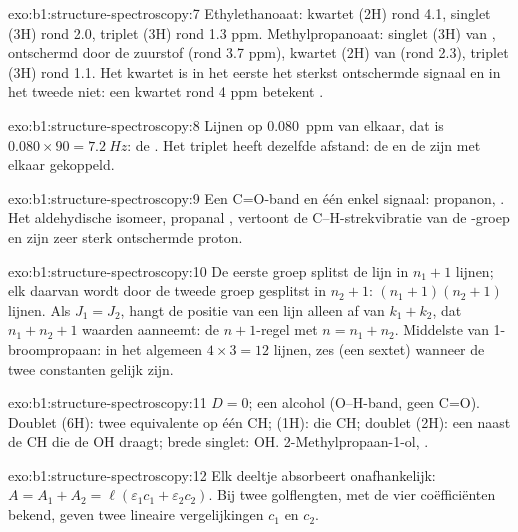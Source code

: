 \begin{solution}{exo:b1:structure-spectroscopy:7}
Ethylethanoaat: kwartet (2H) rond 4.1, singlet (3H) rond 2.0, triplet
(3H) rond 1.3 ppm. Methylpropanoaat: singlet (3H) van ,
ontschermd door de zuurstof (rond 3.7 ppm), kwartet (2H) van
 (rond 2.3), triplet (3H) rond 1.1. Het kwartet is in het
eerste het sterkst ontschermde signaal en in het tweede niet: een kwartet
rond 4 ppm betekent .
\end{solution}

\begin{solution}{exo:b1:structure-spectroscopy:8}
Lijnen op \qty{0.080}{ppm} van elkaar, dat is $0.080 \times 90 = \qty{7.2}{Hz}$:
de . Het triplet heeft dezelfde afstand: de 
en de  zijn met elkaar gekoppeld.
\end{solution}

\begin{solution}{exo:b1:structure-spectroscopy:9}
Een C=O-band en één enkel signaal: propanon, . Het
aldehydische isomeer, propanal , vertoont de
C--H-strekvibratie van de -groep en zijn zeer sterk ontschermde
proton.
\end{solution}

\begin{solution}{exo:b1:structure-spectroscopy:10}
De eerste groep splitst de lijn in $n_1 + 1$ lijnen; elk daarvan wordt
door de tweede groep gesplitst in $n_2 + 1$: $(n_1 + 1)(n_2 + 1)$ lijnen.
Als $J_1 =
J_2$, hangt de positie van een lijn alleen af van $k_1 + k_2$, dat
$n_1 + n_2 +
1$ waarden aanneemt: de $n + 1$-regel met $n = n_1 + n_2$. Middelste
 van 1-broompropaan: in het algemeen $4 \times 3 = 12$ lijnen,
zes (een sextet) wanneer de twee constanten gelijk zijn.
\end{solution}

\begin{solution}{exo:b1:structure-spectroscopy:11}
$D = 0$; een alcohol (O--H-band, geen C=O). Doublet (6H): twee
equivalente  op één CH;  (1H): die CH; doublet (2H): een
 naast de CH die de OH draagt; brede singlet: OH.
2-Methylpropaan-1-ol, .
\end{solution}

\begin{solution}{exo:b1:structure-spectroscopy:12}
Elk deeltje absorbeert onafhankelijk: $A = A_1 + A_2 = \ell(\varepsilon_1c_1
+ \varepsilon_2c_2)$. Bij twee golflengten, met de vier coëfficiënten
bekend, geven twee lineaire vergelijkingen $c_1$ en $c_2$.
\end{solution}

